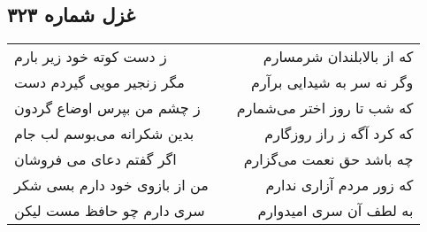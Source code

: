 \begin{center}
\section*{غزل شماره ۳۲۳}
\label{sec:sh323}
\begin{longtable}{l p{0.5cm} r}
ز دست کوته خود زیر بارم
&&
که از بالابلندان شرمسارم
\\
مگر زنجیر مویی گیردم دست
&&
وگر نه سر به شیدایی برآرم
\\
ز چشم من بپرس اوضاع گردون
&&
که شب تا روز اختر می‌شمارم
\\
بدین شکرانه می‌بوسم لب جام
&&
که کرد آگه ز راز روزگارم
\\
اگر گفتم دعای می فروشان
&&
چه باشد حق نعمت می‌گزارم
\\
من از بازوی خود دارم بسی شکر
&&
که زور مردم آزاری ندارم
\\
سری دارم چو حافظ مست لیکن
&&
به لطف آن سری امیدوارم
\\
\end{longtable}
\end{center}
